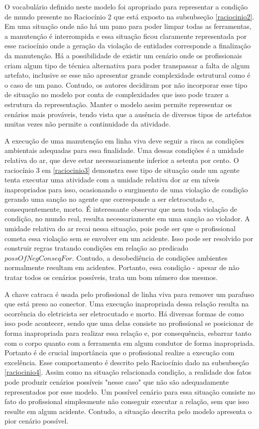 O vocabulário definido neste modelo foi apropriado para representar a condição de mundo presente no Raciocínio 2 que está exposto na subsubseção \ref{raciocinio2}. Em uma situação onde não há um pano para poder limpar todas as ferramentas, a manutenção é interrompida e essa situação ficou claramente representada por esse raciocínio onde a geração da violação de entidades corresponde a finalização da manutenção. Há a possibilidade de existir um cenário onde os profissionais criam algum tipo de técnica alternativa para poder transpassar a falta de algum artefato, inclusive se esse não apresentar grande complexidade estrutural como é o caso de um pano. Contudo, os autores decidiram por não incorporar esse tipo de situação no modelo por conta de complexidades que isso pode trazer a estrutura da representação. Manter o modelo assim permite representar os cenários mais prováveis, tendo vista que a ausência de diversos tipos de artefatos muitas vezes não permite a continuidade da atividade.    

A execução de uma manutenção em linha viva deve seguir a risca as condições ambientais adequadas para essa finalidade. Uma dessas condições é a umidade relativa do ar, que deve estar necessariamente inferior a setenta por cento. O raciocínio 3 em \ref{raciocinio3} demonstra esse tipo de situação onde um agente tenta executar uma atividade com a umidade relativa dor ar em níveis inapropriados para isso, ocasionando o surgimento de uma violação de condição gerando uma sanção no agente que corresponde a ser eletrocutado e, consequentemente, morto. É interessante observar que nem toda violação de condição, no mundo real, resulta necessariamente em uma sanção ao violador. A umidade relativa do ar recai nessa situação, pois pode ser que o profissional cometa essa violação sem se envolver em um acidente. Isso pode ser resolvido por construir regras tratando condições em relação ao predicado $possOfNegConseqFor$. Contudo, a desobediência de condições ambientes normalmente resultam em acidentes. Portanto, essa condição - apesar de não tratar todos os cenários possíveis, trata um bom número dos mesmos.

A chave catraca é usada pelo profissional de linha viva para remover um parafuso que está preso ao conector. Uma execução inapropriada dessa relação resulta na ocorrência do eletricista ser eletrocutado e morto. Há diversas formas de como isso pode acontecer, sendo que uma delas consiste no profissional se posicionar de forma inapropriada para realizar essa relação e, por consequência, esbarrar tanto com o corpo quanto com a ferramenta em algum condutor de forma inapropriada. Portanto é de crucial importância que o profissional realize a execução com excelência. Esse comportamento é descrito pelo Raciocínio dado na subsubseção \ref{raciocinio4}. Assim como na situação relacionada condição, a realidade dos fatos pode produzir cenários possíveis "nesse caso" que não são adequadamente representados por esse modelo. Um possível cenário para essa situação consiste no fato do profissional simplesmente não conseguir executar a relação, sem que isso resulte em algum acidente. Contudo, a situação descrita pelo modelo apresenta o pior cenário possível. 

